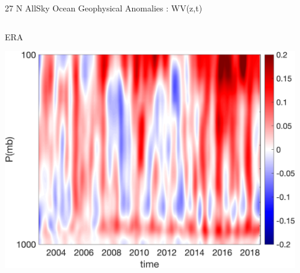 \documentclass[10pt,t]{beamer}
\begin{document}
\begin{frame}{27 N AllSky Ocean Geophysical Anomalies : WV(z,t)}
\vspace{-0.35in}

\begin{columns}
\begin{column}{0.55\columnwidth}
\begin{block}{\footnotesize ERA}
\vspace{-0.1in}
\begin{center}
\includegraphics[width=0.9\linewidth]{Figs/CloudAnom/Desc_ocean/ntropics27_era_cld_wv_anom_200209_201808.png}
\end{center}
\end{block}
\end{column}

\begin{column}{0.55\columnwidth}
\end{column}
\end{columns}

\vspace{-0.45in}


\end{frame}
\end{document}

